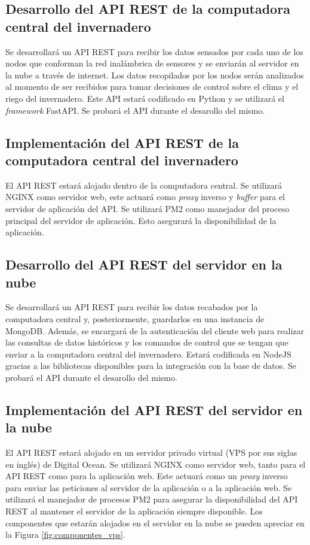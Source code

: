 \subsection{Desarrollo del API REST de la computadora central del invernadero}
Se desarrollará un API REST para recibir los datos sensados por cada uno de los nodos que conforman la red inalámbrica de sensores y se enviarán al servidor en la nube a través de internet. Los datos recopilados por los nodos serán analizados al momento de ser recibidos para tomar decisiones de control sobre el clima y el riego del invernadero. Este API estará codificado en Python y se utilizará el \textit{framework} FastAPI. Se probará el API durante el desarollo del mismo.

\subsection{Implementación del API REST de la computadora central del invernadero}
El API REST estará alojado dentro de la computadora central. Se utilizará NGINX como servidor web, este actuará como \textit{proxy} inverso y \textit{buffer} para el servidor de aplicación del API. Se utilizará PM2 como manejador del proceso principal del servidor de aplicación. Esto asegurará la disponibilidad de la aplicación. 

\subsection{Desarrollo del API REST del servidor en la nube}
Se desarrollará un API REST para recibir los datos recabados por la computadora central y, posteriormente, guardarlos en una instancia de MongoDB. Además, se encargará de la autenticación del cliente web para realizar las consultas de datos históricos y los comandos de control que se tengan que enviar a la computadora central del invernadero. Estará codificada en NodeJS gracias a las bibliotecas disponibles para la integración con la base de datos. Se probará el API durante el desarollo del mismo.

\subsection{Implementación del API REST del servidor en la nube}
El API REST estará alojado en un servidor privado virtual (VPS por sus siglas en inglés) de Digital Ocean. Se utilizará NGINX como servidor web, tanto para el API REST como para la aplicación web. Este actuará como un \textit{proxy} inverso para enviar las peticiones al servidor de la aplicación o a la aplicación web. Se utilizará el manejador de procesos PM2 para asegurar la disponibilidad del API REST al mantener el servidor de la aplicación siempre disponible. Los componentes que estarán alojados en el servidor en la nube se pueden apreciar en la Figura \ref{fig:componentes_vps}.

